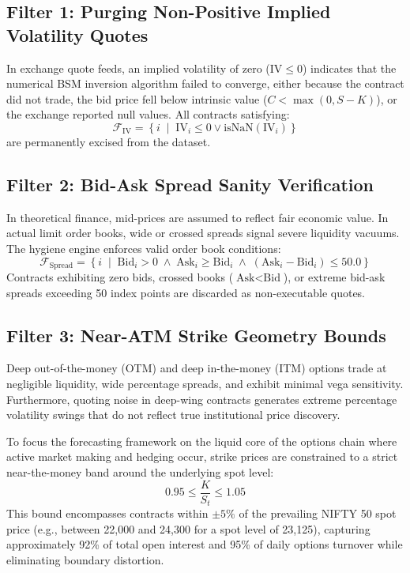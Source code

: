 \subsection{Filter 1: Purging Non-Positive Implied Volatility Quotes}
In exchange quote feeds, an implied volatility of zero ($\text{IV} \le 0$) indicates that the numerical BSM inversion algorithm failed to converge, either because the contract did not trade, the bid price fell below intrinsic value ($C < \max(0, S - K)$), or the exchange reported null values. All contracts satisfying:
\begin{equation}
    \mathcal{F}_{\text{IV}} = \left\{ i \;\middle|\; \text{IV}_i \le 0 \lor \text{isNaN}(\text{IV}_i) \right\}
\end{equation}
are permanently excised from the dataset.

\subsection{Filter 2: Bid-Ask Spread Sanity Verification}
In theoretical finance, mid-prices are assumed to reflect fair economic value. In actual limit order books, wide or crossed spreads signal severe liquidity vacuums. The hygiene engine enforces valid order book conditions:
\begin{equation}
    \mathcal{F}_{\text{Spread}} = \left\{ i \;\middle|\; \text{Bid}_i > 0 \;\land\; \text{Ask}_i \ge \text{Bid}_i \;\land\; (\text{Ask}_i - \text{Bid}_i) \le 50.0 \right\}
\end{equation}
Contracts exhibiting zero bids, crossed books ($\text{Ask} < \text{Bid}$), or extreme bid-ask spreads exceeding 50 index points are discarded as non-executable quotes.

\subsection{Filter 3: Near-ATM Strike Geometry Bounds}
Deep out-of-the-money (OTM) and deep in-the-money (ITM) options trade at negligible liquidity, wide percentage spreads, and exhibit minimal vega sensitivity. Furthermore, quoting noise in deep-wing contracts generates extreme percentage volatility swings that do not reflect true institutional price discovery.

To focus the forecasting framework on the liquid core of the options chain where active market making and hedging occur, strike prices are constrained to a strict near-the-money band around the underlying spot level:
\begin{equation}
    0.95 \le \frac{K}{S_t} \le 1.05
    \label{eq:near_atm_bound}
\end{equation}
This bound encompasses contracts within $\pm 5\%$ of the prevailing NIFTY 50 spot price (e.g., between 22,000 and 24,300 for a spot level of 23,125), capturing approximately 92\% of total open interest and 95\% of daily options turnover while eliminating boundary distortion.

